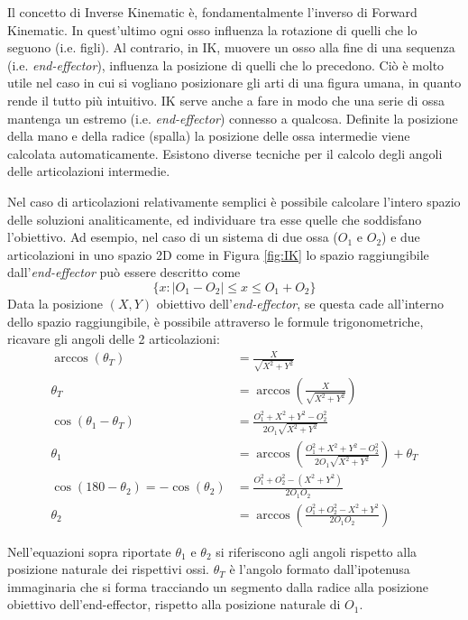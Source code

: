 Il concetto di Inverse Kinematic è, fondamentalmente l'inverso di Forward Kinematic. In quest'ultimo ogni osso influenza la rotazione di quelli che lo seguono (i.e. figli).
Al contrario, in IK, muovere un osso alla fine di una sequenza (i.e. \emph{end-effector}), influenza la posizione di quelli che lo precedono.
Ciò è molto utile nel caso in cui si vogliano posizionare gli arti di una figura umana, in quanto rende il tutto più intuitivo.
IK serve anche a fare in modo che una serie di ossa mantenga un estremo (i.e. \emph{end-effector}) connesso a qualcosa.
Definite la posizione della mano e della radice (spalla) la posizione delle ossa intermedie viene calcolata automaticamente.
Esistono diverse tecniche per il calcolo degli angoli delle articolazioni intermedie.

Nel caso di articolazioni relativamente semplici è possibile calcolare l'intero spazio delle soluzioni analiticamente, ed individuare tra esse quelle che soddisfano l'obiettivo.
Ad esempio, nel caso di un sistema di due ossa ($O_1$ e $O_2$) e due articolazioni in uno spazio 2D come in Figura \ref{fig:IK} lo spazio raggiungibile dall'\emph{end-effector} può essere descritto come 
\begin{equation*}
    \{x: |O_1-O_2| \leq x \leq O_1+O_2\}
\end{equation*}
\newpage
Data la posizione $(X,Y)$ obiettivo dell'\emph{end-effector}, se questa cade all'interno dello spazio raggiungibile, è possibile attraverso le formule trigonometriche, ricavare gli angoli delle 2 articolazioni:
\begin{align}
    \arccos{ (\theta _T) } &=  \frac{X}{\sqrt{X^2+Y^2}}\\
    \theta_T &= \arccos{\left(  \frac{X}{\sqrt{X^2+Y^2}} \right)}\\
    \cos{( \theta_1-\theta_T )} &=  \frac{O_1^2+X^2+Y^2-O_2^2}{2O_1\sqrt{X^2+Y^2}}\\
    \theta_1 &= \arccos{\left(  \frac{O_1^2+X^2+Y^2-O_2^2}{2O_1\sqrt{X^2+Y^2}}\right)}+\theta_T\\
    \cos{(180-\theta_2)} = -\cos{(\theta_2)} &= \frac{O_1^2+O_2^2-(X^2+Y^2)}{2O_1O_2}\\
    \theta_2 &= \arccos{\left(\frac{O_1^2+O_2^2-X^2+Y^2}{2O_1O_2}\right)}
\end{align}

Nell'equazioni sopra riportate $\theta_1$ e $\theta_2$ si riferiscono agli angoli rispetto alla posizione naturale dei rispettivi ossi. $\theta_T$ è l'angolo formato dall'ipotenusa immaginaria che si forma tracciando un segmento dalla radice alla posizione obiettivo dell'end-effector, rispetto alla posizione naturale di $O_1$.

